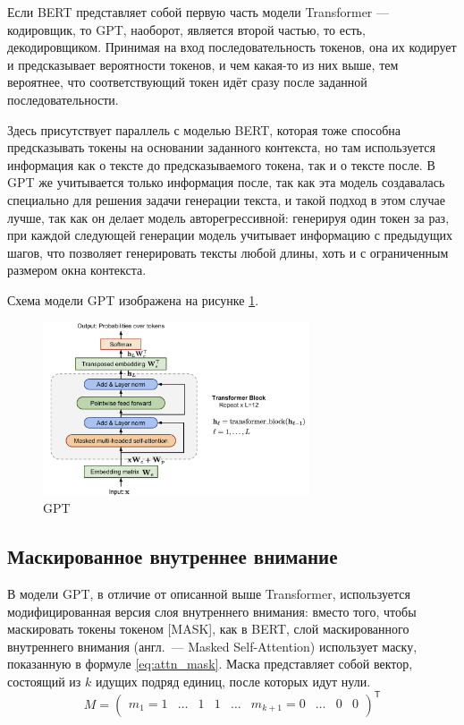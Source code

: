 Если BERT представляет собой первую часть модели Transformer --- кодировщик, то GPT, наоборот, является второй частью, то есть, декодировщиком. Принимая на вход последовательность токенов, она их кодирует и предсказывает вероятности токенов, и чем какая-то из них выше, тем вероятнее, что соответствующий токен идёт сразу после заданной последовательности.

Здесь присутствует параллель с моделью BERT, которая тоже способна предсказывать токены на основании заданного контекста, но там используется информация как о тексте до предсказываемого токена, так и о тексте после. В GPT же учитывается только информация после, так как эта модель создавалась специально для решения задачи генерации текста, и такой подход в этом случае лучше, так как он делает модель авторегрессивной: генерируя один токен за раз, при каждой следующей генерации модель учитывает информацию с предыдущих шагов, что позволяет генерировать тексты любой длины, хоть и с ограниченным размером окна контекста.

Схема модели GPT изображена на рисунке \ref*{fig:gpt}.

\begin{figure}[H]
    \centering
    \includegraphics[width=0.7\textwidth]{../inc/images/gpt.png}
    \caption{GPT}
    \label{fig:gpt}
\end{figure}

\subsection{Маскированное внутреннее внимание}

В модели GPT, в отличие от описанной выше Transformer, используется модифицированная версия слоя внутреннего внимания: вместо того, чтобы маскировать токены токеном [MASK], как в BERT, слой маскированного внутреннего внимания (англ. --- Masked Self-Attention) использует маску, показанную в формуле \ref{eq:attn_mask}. Маска представляет собой вектор, состоящий из $k$ идущих подряд единиц, после которых идут нули.
\begin{equation}
    \label{eq:attn_mask}
    M=\left(\begin{matrix}
        m_1 = 1 & \hdots & 1 & 1 & \hdots & m_{k+1} = 0 & \hdots & 0 & 0
    \end{matrix}\right)^\textsf{T}
\end{equation}

